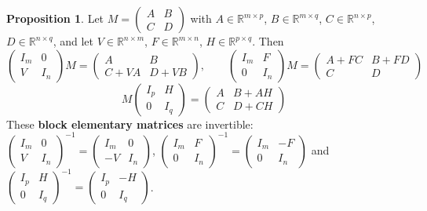 \documentclass[12pt]{article}
\newcommand{\R}{\mathbb R}
\theoremstyle{definition}
\newtheorem{proposition}[theorem]{Proposition}
\begin{document}
\begin{proposition}\label{r5b-prop-block-elementary}
Let \(M=\begin{pmatrix}A&B\\C&D\end{pmatrix}\) with \(A\in\R^{m\times p}\),
\(B\in\R^{m\times q}\), \(C\in\R^{n\times p}\), \(D\in\R^{n\times q}\), and let
\(V\in\R^{n\times m}\), \(F\in\R^{m\times n}\), \(H\in\R^{p\times q}\). Then
\[
\begin{pmatrix}I_m&0\\V&I_n\end{pmatrix}M=\begin{pmatrix}A&B\\C+VA&D+VB\end{pmatrix},\qquad
\begin{pmatrix}I_m&F\\0&I_n\end{pmatrix}M=\begin{pmatrix}A+FC&B+FD\\C&D\end{pmatrix}
\]
\[
M\begin{pmatrix}I_p&H\\0&I_q\end{pmatrix}=\begin{pmatrix}A&B+AH\\C&D+CH\end{pmatrix}
\]
These \textbf{block elementary matrices} are invertible:
\(\left(\begin{smallmatrix}I_m&0\\V&I_n\end{smallmatrix}\right)^{-1}=\left(\begin{smallmatrix}I_m&0\\-V&I_n\end{smallmatrix}\right)\),
\(\left(\begin{smallmatrix}I_m&F\\0&I_n\end{smallmatrix}\right)^{-1}=\left(\begin{smallmatrix}I_m&-F\\0&I_n\end{smallmatrix}\right)\)
and
\(\left(\begin{smallmatrix}I_p&H\\0&I_q\end{smallmatrix}\right)^{-1}=\left(\begin{smallmatrix}I_p&-H\\0&I_q\end{smallmatrix}\right)\).
\end{proposition}
\end{document}
